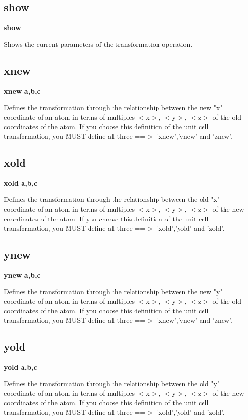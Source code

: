 \subsection*{show}
{\bf show \par }
\par
\vspace{3pt}
Shows the current parameters of the transformation operation. 
\subsection*{xnew}
{\bf xnew a,b,c \par }
\par
\vspace{3pt}
Defines the transformation through the relationship between the new 
"x" coordinate of an atom in terms of multiples $ <$x$> $, $ <$y$> $, $ <$z$> $ of 
the old coordinates of the atom. 
If you choose this definition of the unit cell transformation, you MUST 
define all three ==$> $ 'xnew','ynew' and 'znew'. 
\subsection*{xold}
{\bf xold a,b,c \par }
\par
\vspace{3pt}
Defines the transformation through the relationship between the old 
"x" coordinate of an atom in terms of multiples $ <$x$> $, $ <$y$> $, $ <$z$> $ of 
the new coordinates of the atom. 
If you choose this definition of the unit cell transformation, you MUST 
define all three ==$> $ 'xold','yold' and 'zold'. 
\subsection*{ynew}
{\bf ynew a,b,c \par }
\par
\vspace{3pt}
Defines the transformation through the relationship between the new 
"y" coordinate of an atom in terms of multiples $ <$x$> $, $ <$y$> $, $ <$z$> $ of 
the old coordinates of the atom. 
If you choose this definition of the unit cell transformation, you MUST 
define all three ==$> $ 'xnew','ynew' and 'znew'. 
\subsection*{yold}
{\bf yold a,b,c \par }
\par
\vspace{3pt}
Defines the transformation through the relationship between the old 
"y" coordinate of an atom in terms of multiples $ <$x$> $, $ <$y$> $, $ <$z$> $ of 
the new coordinates of the atom. 
If you choose this definition of the unit cell transformation, you MUST 
define all three ==$> $ 'xold','yold' and 'zold'. 
